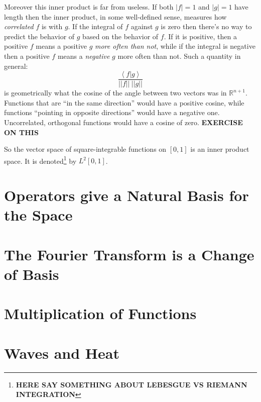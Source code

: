 	Moreover this inner product is far from useless. If both $|f|=1$ and $|g|=1$ have length then the inner product, in some well-defined sense, measures how \emph{correlated} $f$ is with $g$. If the integral of $f$ against $g$ is zero then there's no way to predict the behavior of $g$ based on the behavior of $f$. If it is positive, then a positive $f$ means a positive $g$ \emph{more often than not}, while if the integral is negative then a positive $f$ means a \emph{negative} $g$ more often than not. Such a quantity in general: 
	\begin{equation*}
		\frac{\left< f | g \right>}{||f|| ~ ||g||}
	\end{equation*}
	is geometrically what the cosine of the angle between two vectors was in $\mathbb R^{n+1}$. Functions that are ``in the same direction'' would have a positive cosine, while functions ``pointing in opposite directions'' would have a negative one. Uncorrelated, orthogonal functions would have a cosine of zero.
	\textbf{EXERCISE ON THIS}
	
	So the vector space of square-integrable functions on $[0,1]$ is an inner product space. It is denoted\footnote{\textbf{HERE SAY SOMETHING ABOUT LEBESGUE VS RIEMANN INTEGRATION}} by $L^2[0,1]$. 
	

\section{Operators give a Natural Basis for the Space} %
\label{sec:operators_give_a_natural_basis_for_the_space}


\section{The Fourier Transform is a Change of Basis} %
\label{sec:the_fourier_transform_is_a_change_of_basis}


\section{Multiplication of Functions} %
\label{sec:multiplication_of_functions}


\section{Waves and Heat} %
\label{sec:waves_and_heat}

